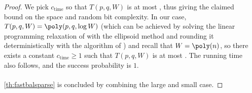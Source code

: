 \begin{proof}
We pick $c_{\text{time}}$ so that $T(p,q,W)$ is at most , thus giving the claimed bound on the space and random bit complexity. In our case, $T(p,q,W)=\poly(p,q,\log W)$ (which can be achieved by solving the linear programming relaxation of \cite{leightonrao} with the ellipsoid method and rounding it deterministically with the algorithm of \cite{llr}) and recall that $W=\poly(n)$, so there exists a constant $c_{\text{time}} \ge 1$ such that $T(p,q,W)$ is at most . The running time also follows, and the success probability is $1$.
\\~\\
 \cref{th:fastbalsparse} is concluded by combining the large and small case.

\end{proof}